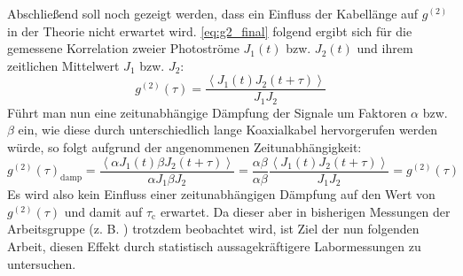 Abschließend soll noch gezeigt werden, dass ein Einfluss der Kabellänge auf $g^{(2)}$ in der Theorie nicht erwartet wird. 
\autoref{eq:g2_final} folgend ergibt sich für die gemessene Korrelation zweier Photoströme $J_1(t)$ bzw. $J_2(t)$ und ihrem zeitlichen Mittelwert $J_1$ bzw. $J_2$:
\begin{equation}
    g^{(2)}(\tau) = \frac{\left<J_1(t) J_2(t+\tau) \right>}{J_1 J_2}
\end{equation}
Führt man nun eine zeitunabhängige Dämpfung der Signale um Faktoren $\alpha$ bzw. $\beta$ ein, wie diese durch unterschiedlich lange Koaxialkabel hervorgerufen werden würde, so folgt aufgrund der angenommenen Zeitunabhängigkeit:
\begin{equation}
    g^{(2)}(\tau)_{\mathrm{damp}} = \frac{\left<\alpha J_1(t) \beta J_2(t+\tau) \right>}{\alpha J_1 \beta J_2}
    = \frac{\alpha \beta}{\alpha \beta} \frac{\left<J_1(t) J_2(t+\tau) \right>}{J_1 J_2} = g^{(2)}(\tau)
\end{equation}
Es wird also kein Einfluss einer zeitunabhängigen Dämpfung auf den Wert von $g^{(2)}(\tau)$ und damit auf $\tau_{\mathrm{c}}$ erwartet. 
Da dieser aber in bisherigen Messungen der Arbeitsgruppe (z. B. \cite{zmijaFirstIntensityInterferometry2023}) trotzdem beobachtet wird, ist Ziel der nun folgenden Arbeit, diesen Effekt durch statistisch aussagekräftigere Labormessungen zu untersuchen. 